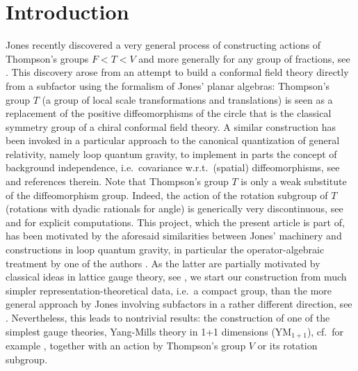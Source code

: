 \documentclass[a4paper,12pt]{amsart}
\numberwithin{equation}{section}
\theoremstyle{definition}
\begin{document}
\maketitle

\section*{Introduction}
Jones recently discovered a very general process of constructing actions of Thompson's groups $F<T<V$ and more generally for any group of fractions, see \cite{Jones17-Thompson,Jones16-Thompson}.
This discovery arose from an attempt to build a conformal field theory directly from a subfactor using the formalism of Jones' planar algebras:
Thompson's group $T$ (a group of local scale transformations and translations) is seen as a replacement of the positive diffeomorphisms of the circle that is the classical symmetry group of a chiral conformal field theory. A similar construction has been invoked in a particular approach to the canonical quantization of general relativity, namely loop quantum gravity, to implement in parts the concept of background independence, i.e.~covariance w.r.t.~(spatial) diffeomorphisms,  see \cite{Thiemann-07-QuantumGR, Baez-96-Spin-Networks, Ashtekar-95-diffeomorphism-invariant-theories} and references therein.
{Note that Thompson's group $T$ is only a weak substitute of the diffeomorphism group. Indeed, the action of the rotation subgroup of $T$ (rotations with dyadic rationals for angle) is generically very discontinuous, see \cite{Jones16-Thompson} and \cite{Brot-Jones18-2} for explicit computations.}
This project, which the present article is part of, has been motivated by the aforesaid similarities between Jones' machinery and constructions in loop quantum gravity, in particular the operator-algebraic treatment by one of the authors \cite{Stottmeister-Thiemann-16-Coherent2, Stottmeister-Thiemann-16-Coherent3}. As the latter are partially motivated by classical ideas in lattice gauge theory, see \cite{Kogut-83-Lattice-Gauge, Creutz-85-Quarks}, we start our construction from much simpler representation-theoretical data, i.e.~a compact group, than the more general approach by Jones involving subfactors in a rather different direction, see \cite{Jones18-Hamiltonian}. Nevertheless, this leads to nontrivial results: the construction of one of the simplest gauge theories, Yang-Mills theory in 1+1 dimensions (YM$_{1+1}$), cf.~for example \cite{Witten-91-Quantum-Gauge, Sengupta-01-Yang-Mills}, together with an action by Thompson's group $V$ or its rotation subgroup.
\end{document}
